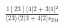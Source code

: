 \documentclass[varwidth, border=5pt]{standalone}
\begin{document}
\begin{my}
$\begin{gathered}
\scriptscriptstyle\frac{1[23]⟨4|2+3|1]²}{⟨23⟩⟨2|3+4|2]s_{234}}
\end{gathered}$
\end{my}
\end{document}
